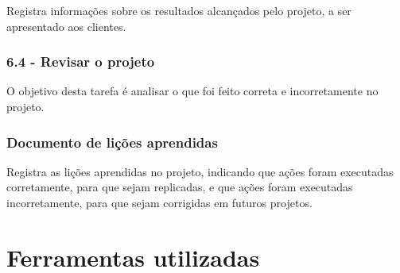 Registra informações sobre os resultados alcançados pelo projeto, a ser apresentado aos clientes.

\subsubsection*{\textbf{6.4 - Revisar o projeto}}

O objetivo desta tarefa é analisar o que foi feito correta e incorretamente no projeto.

\subsubsection*{Documento de lições aprendidas}

Registra as lições aprendidas no projeto, indicando que ações foram executadas corretamente, para que sejam replicadas, e que ações foram executadas incorretamente, para que sejam corrigidas em futuros projetos.

\section{Ferramentas utilizadas}

\cite{scikit-learn}
\cite{pandas}